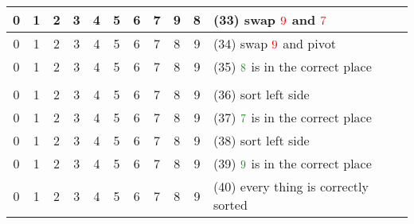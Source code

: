 \begin{center}
\begin{longtable}{ | c | c | c | c | c | c | c | c | c | c || l | }
        \cellcolor{LightGreen}0 & \cellcolor{LightGreen}1 & \cellcolor{LightGreen}2 & \cellcolor{LightGreen}3 & \cellcolor{LightGreen}4 & \cellcolor{LightGreen}5 & \cellcolor{LightGreen}6 & \color{red}7 & \color{red}9 & \cellcolor{LightCyan}8 &(33) swap \(\color{red}9\) and \(\color{red}7\) \\ \hline
        \cellcolor{LightGreen}0 & \cellcolor{LightGreen}1 & \cellcolor{LightGreen}2 & \cellcolor{LightGreen}3 & \cellcolor{LightGreen}4 & \cellcolor{LightGreen}5 & \cellcolor{LightGreen}6 & 7 & \color{cyan}8 & \color{red}9 &(34) swap \(\color{red}9\) and {\color{cyan}pivot} \\ \hline
        \cellcolor{LightGreen}0 & \cellcolor{LightGreen}1 & \cellcolor{LightGreen}2 & \cellcolor{LightGreen}3 & \cellcolor{LightGreen}4 & \cellcolor{LightGreen}5 & \cellcolor{LightGreen}6 & 7 & \cellcolor{LightGreen}8 & 9 &(35) \(\color{green}8\) is in the correct place \\ \hhline{===========}
        \multicolumn{11}{ | c | }{partition the sequence into \((7)\) and \((9)\)} \\ \hhline{===========}
        \cellcolor{LightGreen}0 & \cellcolor{LightGreen}1 & \cellcolor{LightGreen}2 & \cellcolor{LightGreen}3 & \cellcolor{LightGreen}4 & \cellcolor{LightGreen}5 & \cellcolor{LightGreen}6 & \cellcolor{Amber}7 & \cellcolor{LightGreen}8 & \cellcolor{LightGrey}9 &(36) sort {\color{DarkOrange}left side} \\ \hline
        \cellcolor{LightGreen}0 & \cellcolor{LightGreen}1 & \cellcolor{LightGreen}2 & \cellcolor{LightGreen}3 & \cellcolor{LightGreen}4 & \cellcolor{LightGreen}5 & \cellcolor{LightGreen}6 & \cellcolor{LightGreen}7 & \cellcolor{LightGreen}8 & \cellcolor{LightGrey}9 &(37) \(\color{green}7\) is in the correct place \\ \hline
        \cellcolor{LightGreen}0 & \cellcolor{LightGreen}1 & \cellcolor{LightGreen}2 & \cellcolor{LightGreen}3 & \cellcolor{LightGreen}4 & \cellcolor{LightGreen}5 & \cellcolor{LightGreen}6 & \cellcolor{LightGreen}7 & \cellcolor{LightGreen}8 & \cellcolor{Amber}9 &(38) sort {\color{DarkOrange}left side} \\ \hline
        \cellcolor{LightGreen}0 & \cellcolor{LightGreen}1 & \cellcolor{LightGreen}2 & \cellcolor{LightGreen}3 & \cellcolor{LightGreen}4 & \cellcolor{LightGreen}5 & \cellcolor{LightGreen}6 & \cellcolor{LightGreen}7 & \cellcolor{LightGreen}8 & \cellcolor{LightGreen}9 &(39) \(\color{green}9\) is in the correct place \\ \hline
        \cellcolor{LightGreen}0 & \cellcolor{LightGreen}1 & \cellcolor{LightGreen}2 & \cellcolor{LightGreen}3 & \cellcolor{LightGreen}4 & \cellcolor{LightGreen}5 & \cellcolor{LightGreen}6 & \cellcolor{LightGreen}7 & \cellcolor{LightGreen}8 & \cellcolor{LightGreen}9 &(40) every thing is correctly sorted \\ \hline

\end{longtable}
\end{center}
